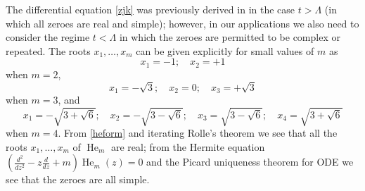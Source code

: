 The differential equation \eqref{zjk} was previously derived in \cite[Lemma 2.4]{csv} in the case $t > \Lambda$ (in which all zeroes are real and simple); however, in our applications we also need to consider the regime $t<\Lambda$ in which the zeroes are permitted to be complex or repeated.
The roots $x_1,\dots,x_m$ can be given explicitly for small values of $m$ as
$$ x_1 = -1; \quad x_2 = +1$$
when $m=2$,
$$ x_1 = -\sqrt{3}; \quad x_2 = 0; \quad x_3 = +\sqrt{3}$$
when $m=3$, and
$$ x_1 = -\sqrt{3+\sqrt{6}}; \quad x_2 = -\sqrt{3-\sqrt{6}}; \quad x_3 = \sqrt{3 - \sqrt{6}}; \quad  x_4 = \sqrt{3 + \sqrt{6}}$$
when $m=4$.  From \eqref{heform} and iterating Rolle's theorem we see that all the roots $x_1,\dots,x_m$ of $\operatorname{He}_m$ are real; from the Hermite equation $\left(\frac{d^2}{dz^2} - z \frac{d}{dz} + m\right) \operatorname{He}_m(z) = 0$ and the Picard uniqueness theorem for ODE we see that the zeroes are all simple.

